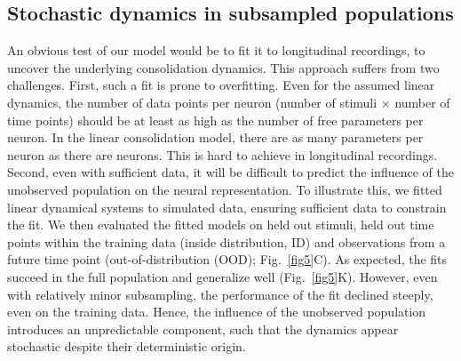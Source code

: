 \subsection{Stochastic dynamics in subsampled populations}

An obvious test of our model would be to fit it to longitudinal recordings, to uncover the underlying consolidation dynamics. This approach suffers from two challenges. First, such a fit is prone to overfitting. Even for the assumed linear dynamics, the number of data points per neuron (number of stimuli $\times$ number of time points) should be at least as high as the number of free parameters per neuron. In the linear consolidation model, there are as many parameters per neuron as there are neurons. This is hard to achieve in longitudinal recordings. Second, even with sufficient data, it will be difficult to predict the influence of the unobserved population on the neural representation. To illustrate this, we fitted linear dynamical systems to simulated data, ensuring sufficient data to constrain the fit. We then evaluated the fitted models on held out stimuli, held out time points within the training data (inside distribution, ID) and observations from a future time point (out-of-distribution (OOD); Fig.~\ref{fig5}C). As expected, the fits succeed in the full population and generalize well (Fig.~\ref{fig5}K). However, even with relatively minor subsampling, the performance of the fit declined steeply, even on the training data. Hence, the influence of the unobserved population introduces an unpredictable component, such that the dynamics appear stochastic despite their deterministic origin. 



